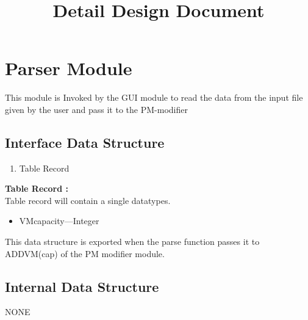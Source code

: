 \documentclass{article}
\title{Detail Design Document}
\begin{document}
\section{Parser Module}
This module is Invoked by the GUI module to read the data from the input file given by the user and pass it to the PM-modifier

\subsection{Interface Data Structure}
\begin{enumerate}
\item Table Record
\end{enumerate}
\textbf{Table Record :}\\
\hspace*{2cm}Table record will contain a single datatypes.
\begin{itemize}
\item VMcapacity---Integer
\end{itemize}
\hspace*{0.5cm}This data structure is exported when the parse function passes it to ADDVM(cap) of the PM modifier module.

\subsection{Internal Data Structure}
\hspace*{1.1cm}NONE
\end{document}
